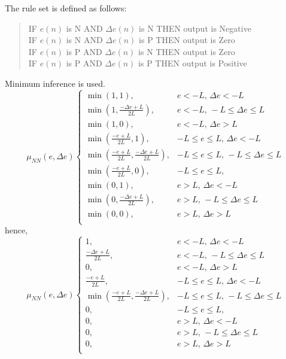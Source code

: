 The rule set is defined as follows:
\begin{quote}
IF $e(n)$ is N AND $\Delta e(n)$ is N THEN output is Negative\\
IF $e(n)$ is N AND $\Delta e(n)$ is P THEN output is Zero\\
IF $e(n)$ is P AND $\Delta e(n)$ is N THEN output is Zero\\
IF $e(n)$ is P AND $\Delta e(n)$ is P THEN output is Positive
\end{quote}
Minimum inference is used.
\begin{equation}
\mu_{NN}(e,\Delta e)\begin{cases}
    \min{\left(1,1\right)},& e<-L ,\, \Delta e<-L\\
    \min{\left(1,\frac{-\Delta e+L}{2L}\right)},& e<-L ,\, -L\leq \Delta e\leq L\\
    \min{\left(1,0\right)},& e<-L ,\, \Delta e>L\\
    \min{\left(\frac{-e+L}{2L},1\right)},& -L\leq e\leq L ,\, \Delta e<-L\\
    \min{\left(\frac{-e+L}{2L},\frac{-\Delta e+L}{2L}\right)},& -L\leq e\leq L ,\, -L\leq \Delta e\leq L\\
    \min{\left(\frac{-e+L}{2L},0\right)},& -L\leq e\leq L ,\, \\
    \min{\left(0,1\right)},& e>L ,\,\Delta e<-L \\
    \min{\left(0,\frac{-\Delta e+L}{2L}\right)},& e>L ,\, -L\leq \Delta e\leq L\\
    \min{\left(0,0\right)},& e>L ,\, \Delta e>L\\
\end{cases}
\end{equation}
hence,
\begin{equation}
\mu_{NN}(e,\Delta e)\begin{cases}
    1,& e<-L ,\, \Delta e<-L\\
    \frac{-\Delta e+L}{2L},& e<-L ,\, -L\leq \Delta e\leq L\\
    0,& e<-L ,\, \Delta e>L\\
    \frac{-e+L}{2L},& -L\leq e\leq L ,\, \Delta e<-L\\
    \min{\left(\frac{-e+L}{2L},\frac{-\Delta e+L}{2L}\right)},& -L\leq e\leq L ,\, -L\leq \Delta e\leq L\\
    0,& -L\leq e\leq L ,\, \\
    0,& e>L ,\,\Delta e<-L \\
    0,& e>L ,\, -L\leq \Delta e\leq L\\
    0,& e>L ,\, \Delta e>L\\
\end{cases}
\end{equation}

